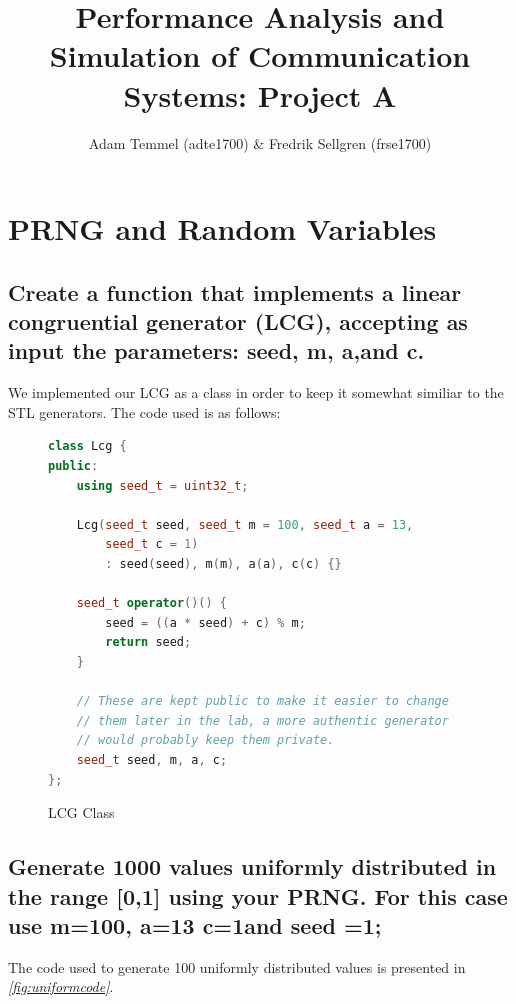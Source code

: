 \documentclass[a4paper, titlepage,12pt]{article}
\title{Performance Analysis and Simulation of Communication Systems: Project A}
\author{Adam Temmel (adte1700) \& Fredrik Sellgren (frse1700)}
\begin{document}
	\maketitle
	\section{PRNG and Random Variables}
		\subsection{Create a function that implements a linear congruential generator (LCG), accepting as input the parameters: seed, m, a,and c.}
		We implemented our LCG as a class in order to keep it somewhat similiar to the STL generators. The code used is as follows:

		\begin{figure}[h!]
			\begin{lstlisting}[language=c++]
class Lcg {
public:
	using seed_t = uint32_t;

	Lcg(seed_t seed, seed_t m = 100, seed_t a = 13, 
		seed_t c = 1) 
		: seed(seed), m(m), a(a), c(c) {}

	seed_t operator()() {
		seed = ((a * seed) + c) % m;
		return seed;
	}

	// These are kept public to make it easier to change 
	// them later in the lab, a more authentic generator
	// would probably keep them private.
	seed_t seed, m, a, c;
};
			\end{lstlisting}
			\caption{LCG Class}
			\label{fig:lcgimpl}
		\end{figure}



		\subsection{Generate 1000 values uniformly distributed in the range [0,1] using your PRNG. For this case use m=100, a=13 c=1and seed =1;}

		The code used to generate 100 uniformly distributed values is presented in \textit{\ref{fig:uniformcode}}.
\end{document}
